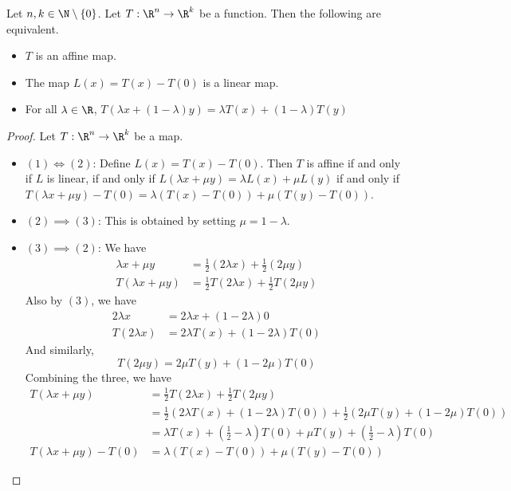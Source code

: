 \documentclass[a4paper]{article}
\begin{document}
\begin{prp}{}{} Let $n,k\in\N\setminus\{0\}$. Let $T:\R^n\to\R^k$ be a function. Then the following are equivalent. 
\begin{itemize}
\item $T$ is an affine map. 
\item The map $L(x)=T(x)-T(0)$ is a linear map. 
\item For all $\lambda\in\R$, $T(\lambda x+(1-\lambda)y)=\lambda T(x)+(1-\lambda)T(y)$
\end{itemize}\tcbline
\begin{proof} Let $T:\R^n\to\R^k$ be a map. 
\begin{itemize}
\item $(1)\iff(2)$: Define $L(x)=T(x)-T(0)$. Then $T$ is affine if and only if $L$ is linear, if and only if $L(\lambda x+\mu y)=\lambda L(x)+\mu L(y)$ if and only if $T(\lambda x+\mu y)-T(0)=\lambda(T(x)-T(0))+\mu(T(y)-T(0))$. 
\item $(2)\implies (3)$: This is obtained by setting $\mu=1-\lambda$. 
\item $(3)\implies (2)$: We have
\begin{align*}
\lambda x+\mu y&=\frac{1}{2}(2\lambda x)+\frac{1}{2}(2\mu y)\\
T(\lambda x+\mu y)&=\frac{1}{2}T(2\lambda x)+\frac{1}{2}T(2\mu y)\tag{By (3)}
\end{align*}
Also by $(3)$, we have
\begin{align*}
2\lambda x&=2\lambda x+(1-2\lambda)0\\
T(2\lambda x)&=2\lambda T(x)+(1-2\lambda)T(0)
\end{align*}
And similarly, $$T(2\mu y)=2\mu T(y)+(1-2\mu)T(0)$$
Combining the three, we have 
\begin{align*}
T(\lambda x+\mu y)&=\frac{1}{2}T(2\lambda x)+\frac{1}{2}T(2\mu y)\\
&=\frac{1}{2}(2\lambda T(x)+(1-2\lambda)T(0))+\frac{1}{2}(2\mu T(y)+(1-2\mu)T(0))\\
&=\lambda T(x)+\left(\frac{1}{2}-\lambda\right)T(0)+\mu T(y)+\left(\frac{1}{2}-\lambda\right)T(0)\\
T(\lambda x+\mu y)-T(0)&=\lambda(T(x)-T(0))+\mu(T(y)-T(0))
\end{align*}
\end{itemize}
\end{proof}
\end{prp}
\end{document}
